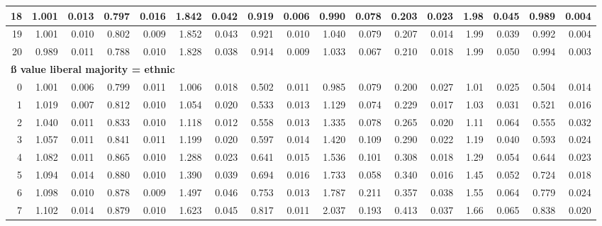 \documentclass[
]{article}
\begin{document}
\begin{table}[H]
{\begin{tabular}[t]{r|r|r|r|r|r|r|r|r|r|r|r|r|r|r|r|r}
\hline
\hspace{1em}18 & 1.001 & 0.013 & 0.797 & 0.016 & 1.842 & 0.042 & 0.919 & 0.006 & 0.990 & 0.078 & 0.203 & 0.023 & 1.98 & 0.045 & 0.989 & 0.004\\
\hline
\hspace{1em}19 & 1.001 & 0.010 & 0.802 & 0.009 & 1.852 & 0.043 & 0.921 & 0.010 & 1.040 & 0.079 & 0.207 & 0.014 & 1.99 & 0.039 & 0.992 & 0.004\\
\hline
\hspace{1em}20 & 0.989 & 0.011 & 0.788 & 0.010 & 1.828 & 0.038 & 0.914 & 0.009 & 1.033 & 0.067 & 0.210 & 0.018 & 1.99 & 0.050 & 0.994 & 0.003\\
\hline
\multicolumn{17}{l}{\textbf{ß value liberal majority = ethnic}}\\
\hline
\hspace{1em}0 & 1.001 & 0.006 & 0.799 & 0.011 & 1.006 & 0.018 & 0.502 & 0.011 & 0.985 & 0.079 & 0.200 & 0.027 & 1.01 & 0.025 & 0.504 & 0.014\\
\hline
\hspace{1em}1 & 1.019 & 0.007 & 0.812 & 0.010 & 1.054 & 0.020 & 0.533 & 0.013 & 1.129 & 0.074 & 0.229 & 0.017 & 1.03 & 0.031 & 0.521 & 0.016\\
\hline
\hspace{1em}2 & 1.040 & 0.011 & 0.833 & 0.010 & 1.118 & 0.012 & 0.558 & 0.013 & 1.335 & 0.078 & 0.265 & 0.020 & 1.11 & 0.064 & 0.555 & 0.032\\
\hline
\hspace{1em}3 & 1.057 & 0.011 & 0.841 & 0.011 & 1.199 & 0.020 & 0.597 & 0.014 & 1.420 & 0.109 & 0.290 & 0.022 & 1.19 & 0.040 & 0.593 & 0.024\\
\hline
\hspace{1em}4 & 1.082 & 0.011 & 0.865 & 0.010 & 1.288 & 0.023 & 0.641 & 0.015 & 1.536 & 0.101 & 0.308 & 0.018 & 1.29 & 0.054 & 0.644 & 0.023\\
\hline
\hspace{1em}5 & 1.094 & 0.014 & 0.880 & 0.010 & 1.390 & 0.039 & 0.694 & 0.016 & 1.733 & 0.058 & 0.340 & 0.016 & 1.45 & 0.052 & 0.724 & 0.018\\
\hline
\hspace{1em}6 & 1.098 & 0.010 & 0.878 & 0.009 & 1.497 & 0.046 & 0.753 & 0.013 & 1.787 & 0.211 & 0.357 & 0.038 & 1.55 & 0.064 & 0.779 & 0.024\\
\hline
\hspace{1em}7 & 1.102 & 0.014 & 0.879 & 0.010 & 1.623 & 0.045 & 0.817 & 0.011 & 2.037 & 0.193 & 0.413 & 0.037 & 1.66 & 0.065 & 0.838 & 0.020\\

\end{tabular}}
\end{table}
\end{document}
